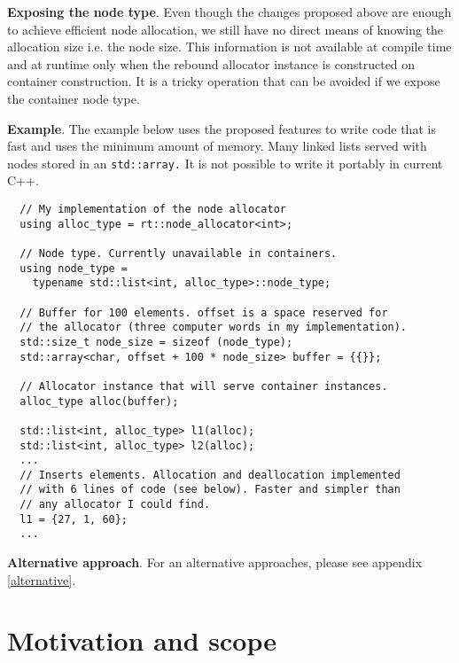 \documentclass[11pt]{article}
\begin{document}
\medskip
\noindent
{\bf Exposing the node type}. Even though the changes proposed above are enough
to achieve efficient node allocation, we still have no direct means of knowing the
allocation size i.e. the node size. This information is not available at
compile time and at runtime only when the rebound allocator instance is
constructed on container construction. It is a tricky operation that can be
avoided if we expose the container node type.

\medskip
\noindent
{\bf Example}. The example below uses the proposed features
to write code that is fast and uses the minimum amount of memory.
Many linked lists served with nodes stored in an \texttt{std::array.}
It is not possible to write it portably in current C++.
\medskip
\begin{lstlisting}
  // My implementation of the node allocator
  using alloc_type = rt::node_allocator<int>;

  // Node type. Currently unavailable in containers.
  using node_type =
    typename std::list<int, alloc_type>::node_type;

  // Buffer for 100 elements. offset is a space reserved for
  // the allocator (three computer words in my implementation).
  std::size_t node_size = sizeof (node_type);
  std::array<char, offset + 100 * node_size> buffer = {{}};

  // Allocator instance that will serve container instances.
  alloc_type alloc(buffer);

  std::list<int, alloc_type> l1(alloc);
  std::list<int, alloc_type> l2(alloc);
  ...
  // Inserts elements. Allocation and deallocation implemented
  // with 6 lines of code (see below). Faster and simpler than
  // any allocator I could find.
  l1 = {27, 1, 60};
  ...
\end{lstlisting}

\medskip
\noindent
{\bf Alternative approach}. For an alternative approaches, please see appendix \ref{alternative}.

\section{Motivation and scope}
\end{document}
